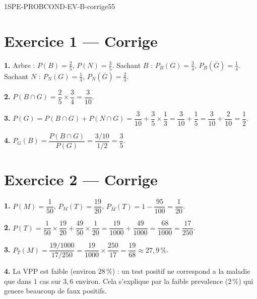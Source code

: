 \begin{evaluation}{1SPE-PROBCOND-EV-B-corrige}{55}

\section*{Exercice 1 --- Corrige}


\textbf{1.} Arbre : $P(B) = \frac{2}{5}$, $P(N) = \frac{3}{5}$. Sachant $B$ : $P_B(G) = \frac{3}{4}$, $P_B(\overline{G}) = \frac{1}{4}$. Sachant $N$ : $P_N(G) = \frac{1}{3}$, $P_N(\overline{G}) = \frac{2}{3}$.

\medskip
\textbf{2.} $P(B \cap G) = \dfrac{2}{5} \times \dfrac{3}{4} = \dfrac{3}{10}$.

\medskip
\textbf{3.} $P(G) = P(B \cap G) + P(N \cap G) = \dfrac{3}{10} + \dfrac{3}{5} \times \dfrac{1}{3} = \dfrac{3}{10} + \dfrac{1}{5} = \dfrac{3}{10} + \dfrac{2}{10} = \dfrac{1}{2}$.

\medskip
\textbf{4.} $P_G(B) = \dfrac{P(B \cap G)}{P(G)} = \dfrac{3/10}{1/2} = \dfrac{3}{5}$.

\section*{Exercice 2 --- Corrige}


\textbf{1.} $P(M) = \dfrac{1}{50}$, $P_M(T) = \dfrac{19}{20}$, $P_{\overline{M}}(T) = 1 - \dfrac{95}{100} = \dfrac{1}{20}$.

\medskip
\textbf{2.} $P(T) = \dfrac{1}{50} \times \dfrac{19}{20} + \dfrac{49}{50} \times \dfrac{1}{20} = \dfrac{19}{1000} + \dfrac{49}{1000} = \dfrac{68}{1000} = \dfrac{17}{250}$.

\medskip
\textbf{3.} $P_T(M) = \dfrac{19/1000}{17/250} = \dfrac{19}{1000} \times \dfrac{250}{17} = \dfrac{19}{68} \approx 27{,}9\,\%$.

\medskip
\textbf{4.} La VPP est faible (environ $28\,\%$) : un test positif ne correspond a la maladie que dans $1$ cas sur $3{,}6$ environ. Cela s'explique par la faible prevalence ($2\,\%$) qui genere beaucoup de faux positifs.


\end{evaluation}
